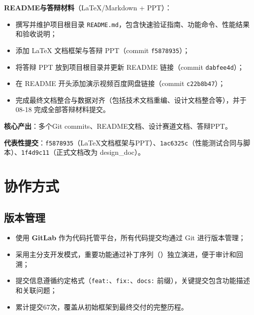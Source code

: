 \textbf{README与答辩材料}（LaTeX/Markdown + PPT）：
\begin{itemize}
    \item 撰写并维护项目根目录 \texttt{README.md}，包含快速验证指南、功能命令、性能结果和验收说明；
    \item 添加 LaTeX 文档框架与答辩 PPT（commit \texttt{f5878935}）；
    \item 将答辩 PPT 放到项目根目录并更新 README 链接（commit \texttt{dabfee4d}）；
    \item 在 README 开头添加演示视频百度网盘链接（commit \texttt{c22b8b47}）；
    \item 完成最终文档整合与数据对齐（包括技术文档重编、设计文档整合等），并于 08-18 完成全部答辩材料提交。
\end{itemize}

\textbf{核心产出}：多个Git commits、README文档、设计赛道文档、答辩PPT。

\textbf{代表性提交}：\texttt{f5878935}（LaTeX文档框架与PPT）、\texttt{1ac6325c}（性能测试合同与脚本）、\texttt{1f4d9c11}（正式文档改为 design\_doc）。

\section{协作方式}

\subsection{版本管理}

\begin{itemize}
    \item 使用 \textbf{GitLab} 作为代码托管平台，所有代码提交均通过 Git 进行版本管理；
    \item 采用主分支开发模式，重要功能通过补丁序列（\texttt{}）独立演进，便于审计和回溯；
    \item 提交信息遵循约定格式（\texttt{feat:}、\texttt{fix:}、\texttt{docs:} 前缀），关键提交包含功能描述和关联问题；
    \item 累计提交67次，覆盖从初始框架到最终交付的完整历程。
\end{itemize}

